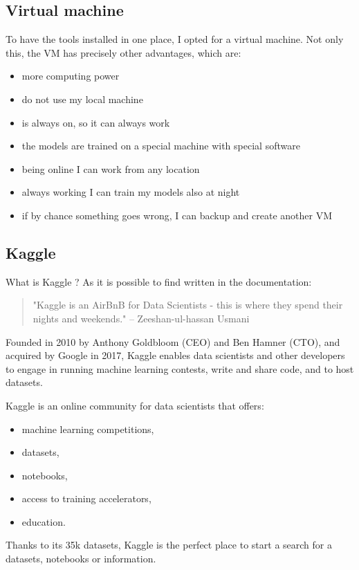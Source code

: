 \subsection{Virtual machine}
To have the tools installed in one place, I opted for a virtual machine.
Not only this, the VM has precisely other advantages, which are:
\begin{itemize}
    \item more computing power
    \item do not use my local machine 
    \item is always on, so it can always work
    \item the models are trained on a special machine with special software
    \item being online I can work from any location
    \item always working I can train my models also at night
    \item if by chance something goes wrong, I can backup and create another VM
\end{itemize}

\subsection{Kaggle}
What is Kaggle \cite{noauthor_kaggle_nodate}? 
As it is possible to find written in the documentation: 
\begin{quote}
    "Kaggle is an AirBnB for Data Scientists - this is where they spend their nights and weekends." – Zeeshan-ul-hassan Usmani \cite{zeeshan-ul-hassan_what_2018}
\end{quote}
Founded in 2010 by Anthony Goldbloom (CEO) and Ben Hamner (CTO), and acquired by Google in 2017, Kaggle enables data scientists and other developers to engage in running machine learning contests, write and share code, and to host datasets. 

Kaggle is an online community for data scientists that offers:
\begin{itemize}
    \item machine learning competitions,
    \item datasets,
    \item notebooks,
    \item access to training accelerators,
    \item education.
\end{itemize}
Thanks to its 35k datasets, Kaggle is the perfect place to start a search for a datasets, notebooks or information.

